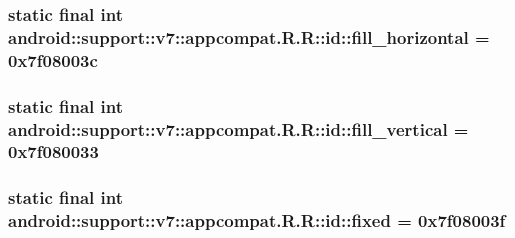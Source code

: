 \hypertarget{classandroid_1_1support_1_1v7_1_1appcompat_1_1_r_1_1id_8baf3f93076f9321e4ba112dac11c904}{
\subsubsection[{fill\_\-horizontal}]{\setlength{\rightskip}{0pt plus 5cm}static final int android::support::v7::appcompat.R.R::id::fill\_\-horizontal = 0x7f08003c}}
\label{classandroid_1_1support_1_1v7_1_1appcompat_1_1_r_1_1id_8baf3f93076f9321e4ba112dac11c904}


\hypertarget{classandroid_1_1support_1_1v7_1_1appcompat_1_1_r_1_1id_adf9863b164588f3bd99800075022dcd}{
\subsubsection[{fill\_\-vertical}]{\setlength{\rightskip}{0pt plus 5cm}static final int android::support::v7::appcompat.R.R::id::fill\_\-vertical = 0x7f080033}}
\label{classandroid_1_1support_1_1v7_1_1appcompat_1_1_r_1_1id_adf9863b164588f3bd99800075022dcd}


\hypertarget{classandroid_1_1support_1_1v7_1_1appcompat_1_1_r_1_1id_d1885e46c62ae0f17bba2d27c15c9da2}{
\subsubsection[{fixed}]{\setlength{\rightskip}{0pt plus 5cm}static final int android::support::v7::appcompat.R.R::id::fixed = 0x7f08003f}}
\label{classandroid_1_1support_1_1v7_1_1appcompat_1_1_r_1_1id_d1885e46c62ae0f17bba2d27c15c9da2}


